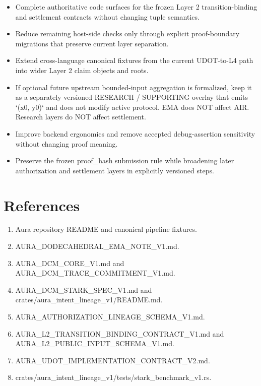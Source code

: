 \documentclass[conference]{IEEEtran}
\begin{document}
\begin{itemize}
\item Complete authoritative code surfaces for the frozen Layer 2 transition-binding and settlement contracts without changing tuple semantics.
\item Reduce remaining host-side checks only through explicit proof-boundary migrations that preserve current layer separation.
\item Extend cross-language canonical fixtures from the current UDOT-to-L4 path into wider Layer 2 claim objects and roots.
\item If optional future upstream bounded-input aggregation is formalized, keep it as a separately versioned RESEARCH / SUPPORTING overlay that emits `(x0, y0)` and does not modify active protocol. EMA does NOT affect AIR. Research layers do NOT affect settlement.
\item Improve backend ergonomics and remove accepted debug-assertion sensitivity without changing proof meaning.
\item Preserve the frozen proof\_hash submission rule while broadening later authorization and settlement layers in explicitly versioned steps.
\end{itemize}
\section{References}
\begin{enumerate}
\item Aura repository README and canonical pipeline fixtures.
\item AURA\_DODECAHEDRAL\_EMA\_NOTE\_V1.md.
\item AURA\_DCM\_CORE\_V1.md and AURA\_DCM\_TRACE\_COMMITMENT\_V1.md.
\item AURA\_DCM\_STARK\_SPEC\_V1.md and crates/aura\_intent\_lineage\_v1/README.md.
\item AURA\_AUTHORIZATION\_LINEAGE\_SCHEMA\_V1.md.
\item AURA\_L2\_TRANSITION\_BINDING\_CONTRACT\_V1.md and AURA\_L2\_PUBLIC\_INPUT\_SCHEMA\_V1.md.
\item AURA\_UDOT\_IMPLEMENTATION\_CONTRACT\_V2.md.
\item crates/aura\_intent\_lineage\_v1/tests/stark\_benchmark\_v1.rs.
\end{enumerate}
\end{document}
